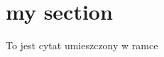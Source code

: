 \documentclass[10pt]{paper}
\begin{document}
\section{my section}

{To jest cytat\cite{Puz2011a} umieszczony w ramce}


{}
\end{document}
